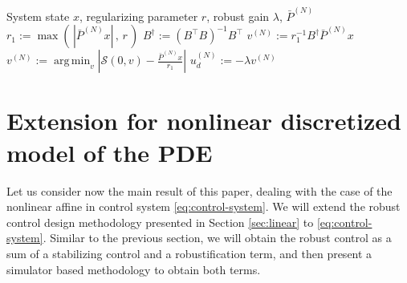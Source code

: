 \documentclass[letterpaper, 10 pt, conference]{ieeeconf}  %
\newcommand{\tp}{^\top}
\newcommand{\inv}{^{-1}}
\newcommand{\R}{\mathbb{R}}
\renewcommand{\S}{\mathcal{S}}
\newcommand{\simulator}{\S}
\DeclareMathOperator*{\argmin}{arg\,min}
\newcommand{\todo}[1]{{\color{blue} #1}}
\newcommand{\cb}{\color{blue}}
\begin{document}
\begin{algorithm}
\begin{algorithmic}[1]
\Input System state $x$, regularizing parameter $r$, robust gain $\lambda$, $\bar{P}^{(N)}$
\State $r_1 := \max( \, |\bar{P}^{(N)}x| \, , \, r \, ) $
\State $B^{\dagger} := (B\tp B)\inv B\tp$
\State $v^{(N)} := r_1\inv B^{\dagger} \bar{P}^{(N)}x$
\State $v^{(N)} := \argmin_{v} | \simulator(0,v) - \frac{\bar{P}^{(N)}x}{r_1} |$
\EndIf
\State \Return $u^{(N)}_d := -\lambda v^{(N)}$
\end{algorithmic}
\caption{Algorithm to find $u_d$}
\label{alg:ud}
\end{algorithm}




\section{Extension for nonlinear discretized model of the PDE}
\label{sec:nonlinear}

Let us consider now the main result of this paper, dealing with the case of the nonlinear affine in control system \eqref{eq:control-system}. We will extend the robust control design methodology presented in Section \ref{sec:linear} to \eqref{eq:control-system}. Similar to the previous section, we will obtain the robust control as a sum of a stabilizing control and a robustification term, and then present a simulator based methodology to obtain both terms. 
\end{document}
